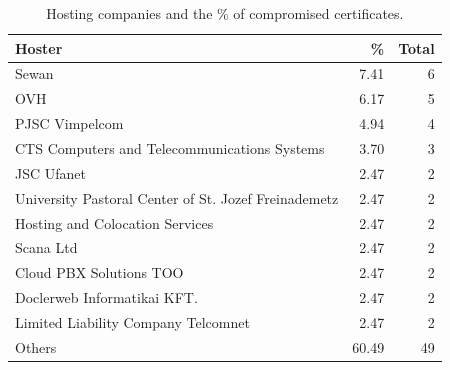 \begin{table}
\centering
\footnotesize
\caption{Hosting companies and the \% of compromised certificates.}
\begin{tabular}{lrr}
\toprule
\textbf{Hoster} & \textbf{\%} & \textbf{Total} \\
\midrule
Sewan & 7.41 & 6 \\
OVH & 6.17 & 5 \\
PJSC Vimpelcom & 4.94 & 4 \\
CTS Computers and Telecommunications Systems & 3.70 & 3 \\
JSC Ufanet & 2.47 & 2 \\
University Pastoral Center of St. Jozef Freinademetz & 2.47 & 2 \\
Hosting and Colocation Services & 2.47 & 2 \\
Scana Ltd & 2.47 & 2 \\
Cloud PBX Solutions TOO & 2.47 & 2 \\
Doclerweb Informatikai KFT. & 2.47 & 2 \\
Limited Liability Company Telcomnet & 2.47 & 2 \\
Others & 60.49 & 49 \\
\bottomrule
\end{tabular}
\label{tab:hosting-compromised_certs}
\end{table}